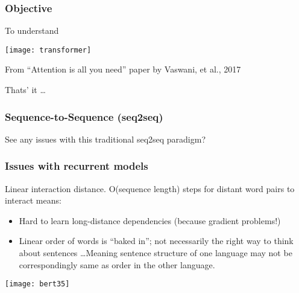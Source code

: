 \begin{frame}[fragile]\frametitle{Objective}

To understand

			\begin{center}
			\texttt{[image: transformer]}
			
			{\tiny From ``Attention is all you need'' paper by Vaswani, et al., 2017}
			\end{center}		

			Thats' it \ldots
			
\end{frame}

\begin{frame}[fragile]\frametitle{Sequence-to-Sequence (seq2seq)}

\begin{center}
See any issues with this traditional seq2seq paradigm?
\end{center}	

\end{frame}

\begin{frame}[fragile]\frametitle{Issues with recurrent models}


Linear interaction distance. O(sequence length) steps for distant word pairs to interact means:

\begin{itemize}
\item Hard to learn long-distance dependencies (because gradient problems!)
\item Linear order of words is ``baked in''; not necessarily the  right way to think about sentences \ldots Meaning sentence structure of one language may not be correspondingly same as order in the other language.
\end{itemize}	 

\begin{center}
\texttt{[image: bert35]}
\end{center}	

 
\end{frame}

